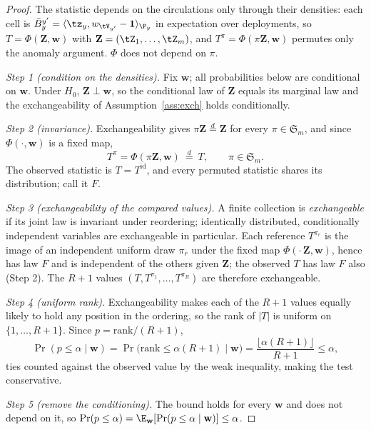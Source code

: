 \begin{proof}
The statistic depends on the circulations only through their densities: each cell
is $\bar B_y^{y'} = \langle \tz_y, w_{\tV_{y'}} - \mathbf 1\rangle_{\P_y}$ in
expectation over deployments, so $T = \Phi(\mathbf Z, \mathbf w)$ with
$\mathbf Z = (\tZ_1,\ldots,\tZ_m)$, and $T^\pi = \Phi(\pi\mathbf Z, \mathbf w)$
permutes only the anomaly argument. $\Phi$ does not depend on $\pi$.

\emph{Step 1 (condition on the densities).}
Fix $\mathbf w$; all probabilities below are conditional on $\mathbf w$. Under
$H_0$, $\mathbf Z \perp \mathbf w$, so the conditional law of $\mathbf Z$ equals
its marginal law and the exchangeability of Assumption~\ref{ass:exch} holds
conditionally.

\emph{Step 2 (invariance).}
Exchangeability gives $\pi\mathbf Z \overset{d}{=} \mathbf Z$ for every
$\pi\in\mathfrak S_m$, and since $\Phi(\cdot,\mathbf w)$ is a fixed map,
\begin{equation}
  T^\pi = \Phi(\pi\mathbf Z,\mathbf w) \ \overset{d}{=}\ T,
  \qquad \pi\in\mathfrak S_m .
\end{equation}
The observed statistic is $T = T^{\mathrm{id}}$, and every permuted statistic
shares its distribution; call it $F$.

\emph{Step 3 (exchangeability of the compared values).}
A finite collection is \emph{exchangeable} if its joint law is invariant under
reordering; identically distributed, conditionally independent variables are
exchangeable in particular. Each reference $T^{\pi_r}$ is the image of an
independent uniform draw $\pi_r$ under the fixed map
$\Phi(\cdot\,\mathbf Z,\mathbf w)$, hence has law $F$ and is independent of the
others given $\mathbf Z$; the observed $T$ has law $F$ also (Step 2). The $R+1$
values $(T, T^{\pi_1},\ldots,T^{\pi_R})$ are therefore exchangeable.

\emph{Step 4 (uniform rank).}
Exchangeability makes each of the $R+1$ values equally likely to hold any
position in the ordering, so the rank of $|T|$ is uniform on $\{1,\ldots,R+1\}$.
Since $p = \mathrm{rank}/(R+1)$,
\begin{equation}
  \Pr(p\le\alpha \mid \mathbf w)
  = \Pr\big(\mathrm{rank}\le\alpha(R+1) \mid \mathbf w\big)
  = \frac{\lfloor\alpha(R+1)\rfloor}{R+1}
  \le \alpha,
\end{equation}
ties counted against the observed value by the weak inequality, making the test
conservative.

\emph{Step 5 (remove the conditioning).}
The bound holds for every $\mathbf w$ and does not depend on it, so
$\Pr(p\le\alpha) = \E_{\mathbf w}[\Pr(p\le\alpha\mid\mathbf w)] \le \alpha$.
\qedhere
\end{proof}

